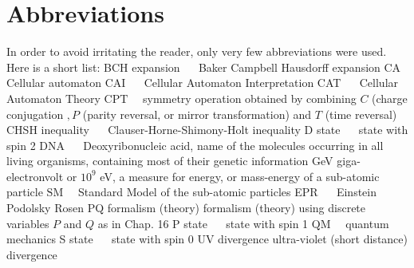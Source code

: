 \documentclass[main.tex]{subfiles}
\begin{document}
\section{Abbreviations}

In order to avoid irritating the reader, only very few abbreviations were used. Here is a short list:
BCH expansion $\quad$ Baker Campbell Hausdorff expansion
$\mathrm{CA}$
Cellular automaton
CAI $\quad$ Cellular Automaton Interpretation
CAT $\quad$ Cellular Automaton Theory
$\mathrm{CPT} \quad$ symmetry operation obtained by combining $C$ (charge conjugation $, P$ (parity reversal, or mirror transformation) and $T$ (time reversal) CHSH inequality $\quad$ Clauser-Horne-Shimony-Holt inequality
D state $\quad$ state with spin 2
DNA $\quad$ Deoxyribonucleic acid, name of the molecules occurring
in all living organisms, containing most of their genetic information
GeV giga-electronvolt or $10^{9}$ eV, a measure for energy, or mass-energy of a sub-atomic particle
$\mathrm{SM} \quad$ Standard Model of the sub-atomic particles
EPR $\quad$ Einstein Podolsky Rosen
PQ formalism (theory) formalism (theory) using discrete variables $P$ and $Q$ as in Chap. 16 P state $\quad$ state with spin 1
$\mathrm{QM} \quad$ quantum mechanics
S state $\quad$ state with spin 0
UV divergence
ultra-violet (short distance) divergence
\end{document}
